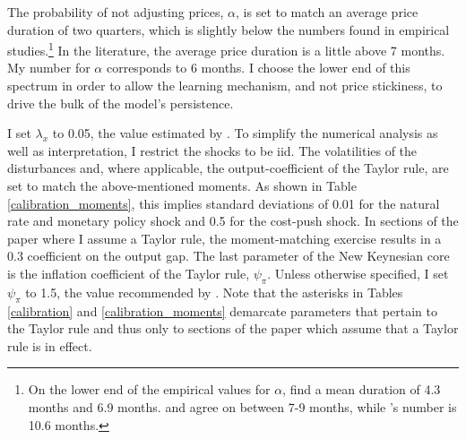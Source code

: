 \documentclass[11pt]{article}
\renewcommand{\[}{\begin{equation}}
\renewcommand{\]}{\end{equation}}
\begin{document}
The probability of not adjusting prices, $\alpha$, is set to match an average price duration of two quarters, which is slightly below the numbers found in empirical studies.\footnote{On the lower end of the empirical values for $\alpha$, \cite{bils2004some} find a mean duration of 4.3 months and \cite{klenow2010microeconomic} 6.9 months. \cite{klenow2008state} and \cite{nakamura2008five} agree on between 7-9 months, while \cite{eichenbaum2011reference}'s number is 10.6 months.} In the literature, the average price duration is a little above 7 months. My number for $\alpha$ corresponds to 6 months. I choose the lower end of this spectrum in order to allow the learning mechanism, and not price stickiness, to drive the bulk of the model's persistence.

I set $\lambda_x$ to 0.05, the value estimated by \cite{rotemberg1997optimization}. 
To simplify the numerical analysis as well as interpretation, I restrict the shocks to be iid. The volatilities of the disturbances and, where applicable, the output-coefficient of the Taylor rule, are set to match the above-mentioned moments. As shown in Table \ref{calibration_moments}, this implies standard deviations of 0.01 for the natural rate and monetary policy shock and 0.5 for the cost-push shock. In sections of the paper where I assume a Taylor rule, the moment-matching exercise results in a 0.3 coefficient on the output gap. The last parameter of the New Keynesian core is the inflation coefficient of the Taylor rule, $\psi_{\pi}$. Unless otherwise specified, I set $\psi_{\pi}$ to 1.5, the value recommended by \cite{taylor1993discretion}. Note that the asterisks in Tables \ref{calibration} and \ref{calibration_moments} demarcate parameters that pertain to the Taylor rule and thus only to sections of the paper which assume that a Taylor rule is in effect.
\end{document}
